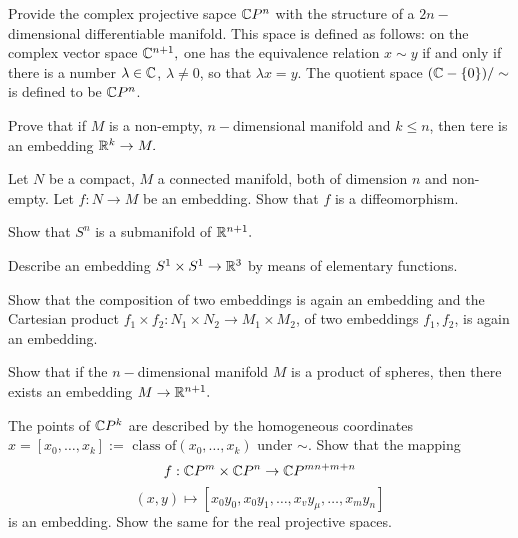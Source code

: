 \begin{problem}{8}
Provide the complex projective sapce $\mathbb{C} P^n$ with the structure of a $2n-$dimensional differentiable manifold. This space is defined as follows: on the complex vector space $\mathbb{C}^{n+1},$ one has the equivalence relation $x \sim y$ if and only if there is a number $\lambda \in \mathbb{C}$, $\lambda \neq 0$, so that $\lambda x = y$. The quotient space $(\mathbb{C} - \{0\}) / \sim $ is defined to be $\mathbb{C} P^n$. 
\end{problem}

\begin{problem}{9}
Prove that if $M$ is a non-empty, $n-$dimensional manifold and $k \leq n$, then tere is an embedding $\mathbb{R}^k \rightarrow M.$
\end{problem}

\begin{problem}{10}
Let $N$ be a compact, $M$ a connected manifold, both of dimension $n$ and non-empty. Let $f: N \rightarrow M$ be an embedding. Show that $f$ is a diffeomorphism.
\end{problem}


\begin{problem}{11}
Show that $S^n$ is a submanifold of $\mathbb{R}^{n+1}.$
\end{problem}


\begin{problem}{12}
Describe an embedding $S^1 \times S^1 \rightarrow \mathbb{R}^3$ by means of elementary functions.
\end{problem}


\begin{problem}{13}
Show that the composition of two embeddings is again an embedding and the Cartesian product $f_1 \times f_2: N_1 \times N_2 \rightarrow M_1 \times M_2$, of two embeddings $f_1, f_2$, is again an embedding. 
\end{problem}


\begin{problem}{14}
Show that if the $n-$dimensional manifold $M$ is a product of spheres, then there exists an embedding $M\rightarrow \mathbb{R}^{n+1}.$
\end{problem}


\begin{problem}{15}
The points of $\mathbb{C} P^k$ are described by the homogeneous coordinates $x = [x_0, \ldots, x_k]:= \text{ class of} (x_0, \ldots, x_k)$ under $\sim$. Show that the mapping 
$$
f: \mathbb{C} P^m \times \mathbb{C} P^n \rightarrow \mathbb{C} P^{mn + m + n}
$$
$$
(x, y) \mapsto [x_0y_0, x_0 y_1, \ldots, x_v y_\mu, \ldots, x_m y_n ]
$$
is an embedding. Show the same for the real projective spaces. 
\end{problem}


